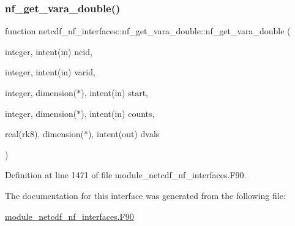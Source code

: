 \subsubsection{\texorpdfstring{nf\+\_\+get\+\_\+vara\+\_\+double()}{nf\_get\_vara\_double()}}
{\footnotesize\ttfamily function netcdf\+\_\+nf\+\_\+interfaces\+::nf\+\_\+get\+\_\+vara\+\_\+double\+::nf\+\_\+get\+\_\+vara\+\_\+double (\begin{DoxyParamCaption}\item[{integer, intent(in)}]{ncid,  }\item[{integer, intent(in)}]{varid,  }\item[{integer, dimension($\ast$), intent(in)}]{start,  }\item[{integer, dimension($\ast$), intent(in)}]{counts,  }\item[{real(rk8), dimension($\ast$), intent(out)}]{dvals }\end{DoxyParamCaption})}



Definition at line 1471 of file module\+\_\+netcdf\+\_\+nf\+\_\+interfaces.\+F90.



The documentation for this interface was generated from the following file\+:\begin{DoxyCompactItemize}
\item 
\hyperlink{module__netcdf__nf__interfaces_8F90}{module\+\_\+netcdf\+\_\+nf\+\_\+interfaces.\+F90}\end{DoxyCompactItemize}
